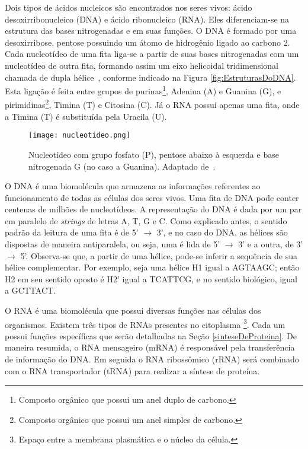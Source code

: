 \indent Dois tipos de ácidos nucleicos são encontrados nos seres vivos: ácido desoxirribonucleico (DNA) e ácido ribonucleico (RNA). Eles diferenciam-se na estrutura das bases nitrogenadas e em suas funções. O DNA é formado por uma desoxirribose, pentose possuindo um átomo de hidrogênio ligado ao carbono 2. Cada nucleotídeo de uma fita liga-se a partir de suas bases nitrogenadas com um nucleotídeo de outra fita, formando assim um eixo helicoidal tridimensional chamada de dupla hélice~\cite{setubal97}, conforme indicado na Figura \ref{fig:EstruturasDoDNA}. Esta ligação é feita entre grupos de purinas\footnote{Composto orgânico que possui um anel duplo de carbono.}, Adenina (A) e Guanina (G), e pirimidinas\footnote{Composto orgânico que possui um anel simples de carbono.}, Timina (T) e Citosina (C). Já o RNA possui apenas uma fita, onde a Timina (T) é substituída pela Uracila (U).

\begin{figure}[h]
    \centering
    \texttt{[image: nucleotideo.png]}
    \caption{Nucleotídeo com grupo fosfato (P), pentose abaixo à esquerda e base nitrogenada G (no caso a Guanina). Adaptado de~\cite{dnadiscovery08}. }
    \label{fig:Nucleotideo}
\end{figure} 

\indent O DNA é uma biomolécula que armazena as informações referentes ao funcionamento de todas as células dos seres vivos. Uma fita de DNA pode conter centenas de milhões de nucleotídeos. A representação do DNA é dada por um par em paralelo de \textit{strings} de letras A, T, G e C. Como explicado antes, o sentido padrão da leitura de uma fita é de 5' $\rightarrow$ 3', e no caso do DNA, as hélices são dispostas de maneira antiparalela, ou seja, uma é lida de 5' $\rightarrow$ 3' e a outra, de 3' $\rightarrow$ 5'. Observa-se que, a partir de uma hélice, pode-se inferir a sequência de sua hélice complementar. Por exemplo, seja uma hélice H1 igual a AGTAAGC; então H2 em seu sentido oposto é H2' igual a TCATTCG, e no sentido biológico, igual a GCTTACT.

\indent O RNA é uma biomolécula que possui diversas funções nas células dos organismos. Existem três tipos de RNAs presentes no citoplasma \footnote{Espaço entre a membrana plasmática e o núcleo da célula.}. Cada um possui funções específicas que serão detalhadas na Seção \ref{sinteseDeProteina}. De maneira resumida, o RNA mensageiro (mRNA) é responsável pela transferência de informação do DNA. Em seguida o RNA ribossômico (rRNA) será combinado com o RNA transportador (tRNA) para realizar a síntese de proteína.

